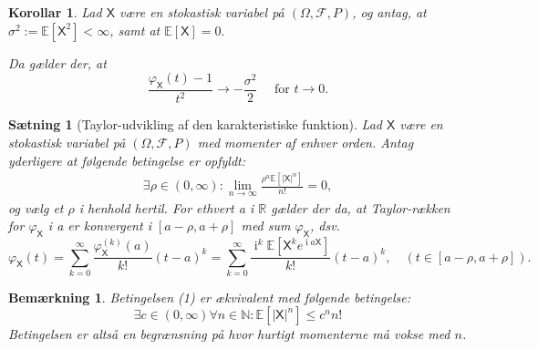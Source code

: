 \documentclass{article}
\newcommand{\N}{\mathbb{N}}
\newcommand{\R}{\mathbb{R}}
\newcommand{\E}{\mathbb{E}}
\newcommand{\1}{\mathbbm{1}}
\newcommand{\X}{\mathsf{X}}
\newcommand{\icomp}{\operatorname{i}}
\newcommand{\varx}{\varphi_\X}
\newcommand{\pfield}{(\Omega, \mathcal{F}, P)}
\theoremstyle{boxed}
\newtheorem{corollary}[theorem]{Korollar}
\newtheorem{remark}[theorem]{Bemærkning}
\newtheorem{proposition}[theorem]{Sætning}
\begin{document}
\begin{theorem-box}
    \begin{corollary}
        Lad $\X$ være en stokastisk variabel på $\pfield$, og antag, at $\sigma^2:=\E[\X^2]<\infty$, samt at $\E[\X]=0.$
        
        Da gælder der, at 
        $$\frac{\varx(t)-1}{t^2}\longrightarrow -\frac{\sigma^2}{2}\quad \text{ for }t\rightarrow 0.$$
    \end{corollary}
\end{theorem-box}
\begin{theorem-box}
    \begin{proposition}[Taylor-udvikling af den karakteristiske funktion]
        Lad $\X$ være en stokastisk variabel på $\pfield$ med momenter af enhver orden. Antag yderligere at følgende betingelse er opfyldt: 
        \begin{align}\exists\rho\in(0,\infty):\lim_{n\rightarrow\infty}\frac{\rho^n\E[|\X|^n]}{n!}=0,\end{align}
        og vælg et $\rho$ i henhold hertil. For ethvert a i $\R$ gælder der da, at Taylor-rækken for $\varx$ i a er konvergent i $[a-\rho, a+\rho]$ med sum $\varx$, dsv.
        $$\varx(t)=\sum_{k=0}^{\infty}\frac{\varx^{(k)}(a)}{k!}(t-a)^k=\sum_{k=0}^{\infty}\frac{\icomp^k\E[\X^ke^{\icomp a\X}]}{k!}(t-a)^k, \quad (t\in[a-\rho, a+\rho]).$$ 
    \end{proposition}
\end{theorem-box}
\begin{remark}
    Betingelsen (1) er ækvivalent med følgende betingelse:
    $$\exists c\in(0,\infty)\forall n\in\N:\E[|\X|^n]\leq c^n n!$$
    Betingelsen er altså en begrænsning på hvor hurtigt momenterne må vokse med $n$.
\end{remark}
\end{document}
